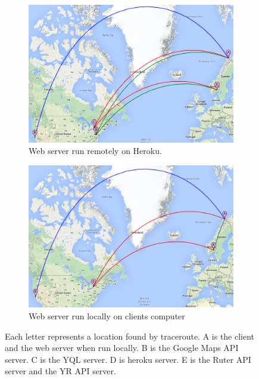 \documentclass[10pt,a4paper]{article}
\begin{document}
\begin{figure}
\centering
\begin{subfigure}{\textwidth}
\includegraphics[width=\textwidth]{../traceroute/heroku_markers}
\caption{Web server run remotely on Heroku.}
\label{fig:traceroute_heroku}
\end{subfigure}


\begin{subfigure}{\textwidth}
\centering
\includegraphics[width=\textwidth]{../traceroute/localhost_markers}
\caption{Web server run locally on clients computer }
\label{fig:traceroute_localhost}
\end{subfigure}
\caption{Each letter represents a location found by traceroute. A is the client and the web server when run locally. B is the Google Maps API server. C is the YQL server. D is heroku server. E is the Ruter API server and the YR API server.}
\label{fig:traceroute}
\end{figure}
\end{document}
